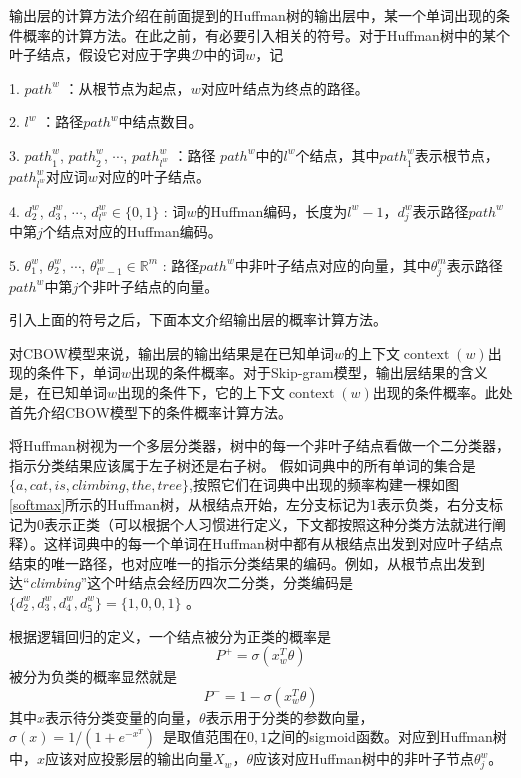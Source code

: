 输出层的计算方法介绍在前面提到的Huffman树的输出层中，某一个单词出现的条件概率的计算方法。在此之前，有必要引入相关的符号。对于Huffman树中的某个叶子结点，假设它对应于字典$\mathcal{D}$中的词$w$，记

\begin {itemize}
{
\item[] 1. ${path}^w$ ：从根节点为起点，$w$对应叶结点为终点的路径。

\item[] 2. $l^w$ ：路径${path}^w$中结点数目。

\item[] 3. ${path}_{1}^{w}$, ${path}_{2}^{w}$, $\cdots$, ${path}_{l^w}^{w}$ ：路径 ${path}^w$中的$l^w$个结点，其中${path}_{1}^{w}$表示根节点，${path}_{l^w}^{w}$对应词$w$对应的叶子结点。

\item[] 4. $d_{2}^{w}$, $d_{3}^{w}$, $\cdots$, $d_{l^w}^{w}\in \{0,1\}$ : 词$w$的Huffman编码，长度为$l^w - 1$，$d_{j}^{w}$表示路径${path}^w$中第$j$个结点对应的Huffman编码。

\item[] 5. $\theta_{1}^{w}$, $\theta_{2}^{w}$, $\cdots$, $\theta_{l^w - 1}^{w}\in \mathbb{R}^{m}$ : 路径${path}^w$中非叶子结点对应的向量，其中$\theta_{j}^{m}$表示路径 ${path}^w$中第$j$个非叶子结点的向量。
}
\end {itemize}

引入上面的符号之后，下面本文介绍输出层的概率计算方法。

对CBOW模型来说，输出层的输出结果是在已知单词$w$的上下文$\operatorname {context}(w)$出现的条件下，单词$w$出现的条件概率。对于Skip-gram模型，输出层结果的含义是，在已知单词$w$出现的条件下，它的上下文$\operatorname {context}(w)$出现的条件概率。此处首先介绍CBOW模型下的条件概率计算方法。

将Huffman树视为一个多层分类器，树中的每一个非叶子结点看做一个二分类器，指示分类结果应该属于左子树还是右子树。
假如词典中的所有单词的集合是$\{a,cat,is,climbing,the,tree\}$,按照它们在词典中出现的频率构建一棵如图\ref{softmax}所示的Huffman树，从根结点开始，左分支标记为1表示负类，右分支标记为0表示正类（可以根据个人习惯进行定义，下文都按照这种分类方法就进行阐释）。这样词典中的每一个单词在Huffman树中都有从根结点出发到对应叶子结点结束的唯一路径，也对应唯一的指示分类结果的编码。例如，从根节点出发到达“\emph{climbing}”这个叶结点会经历四次二分类，分类编码是$\{d_{2}^{w}, d_{3}^{w},d_{4}^{w} ,d_{5}^{w}\} = \{1,0,0,1\}$ 。

根据逻辑回归的定义，一个结点被分为正类的概率是
\begin{equation}
P^+ =\sigma(x_{w}^{T}\theta )
\end{equation}
被分为负类的概率显然就是
\begin{equation}
 P^- =1 - \sigma(x_{w}^{T}\theta )
\end{equation}
其中$x$表示待分类变量的向量，$\theta$表示用于分类的参数向量，$\sigma(x) = 1/(1+e^{-x^{T}} )$\
是取值范围在${0,1}$之间的sigmoid函数。对应到Huffman树中，$x$应该对应投影层的输出向量$X_w$，$\theta$应该对应Huffman树中的非叶子节点$\theta_{j}^{w}$。

